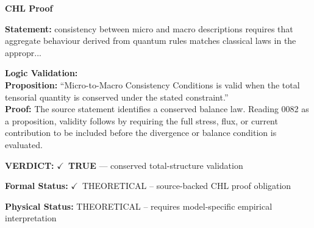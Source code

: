 \vspace{0.45em}
\noindent\textbf{CHL Proof}\par
\textbf{Statement:} consistency between micro and macro descriptions requires that aggregate behaviour
derived from quantum rules matches classical laws in the appropr...

\textbf{Logic Validation:}\\
\textbf{Proposition:} ``Micro-to-Macro Consistency Conditions is valid when the total tensorial quantity is
conserved under the stated constraint.''\\
\textbf{Proof:} The source statement identifies a conserved balance law. Reading 0082 as a proposition,
validity follows by requiring the full stress, flux, or current contribution to be
included before the divergence or balance condition is evaluated.

\textbf{VERDICT:} \ensuremath{\checkmark}\ \textbf{TRUE} --- conserved total-structure validation

\textbf{Formal Status:} \ensuremath{\checkmark}\ THEORETICAL -- source-backed CHL proof obligation

\textbf{Physical Status:} THEORETICAL -- requires model-specific empirical interpretation
\par\vspace{0.45em}
\par
\ifTZPDarkEdition
{}
\fi
\endgroup
\endgroup
